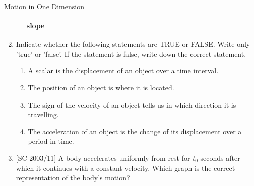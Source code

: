 \begin{eocexercises}{Motion in One Dimension}
\begin{enumerate}[noitemsep, label=\textbf{\arabic*}. ]
\begin{table}[H]
\begin{center}
\begin{tabular}{|l|l|}
         &
        slope \\ \hline
    \end{tabular}
      \end{center}
\end{table}
    \par
          \label{m38796*uid181}\item Indicate whether the following statements are TRUE or FALSE. Write only 'true' or 'false'. If the statement is false, write down the correct statement.
\label{m38796*id81564}\begin{enumerate}[noitemsep, label=\textbf{\alph*}. ] 
            \label{m38796*uid182}\item A scalar is the displacement of an object over a time interval.
\label{m38796*uid183}\item The position of an object is where it is located.
\label{m38796*uid184}\item The sign of the velocity of an object tells us in which direction it is travelling.
\label{m38796*uid185}\item The acceleration of an object is the change of its displacement over a period in time.
\end{enumerate}
\item{[SC 2003/11] A body accelerates uniformly from rest for $t_0$ seconds after which it continues with a constant velocity. Which graph is the correct representation of the body's motion?

}
\end{enumerate}
\end{eocexercises}
